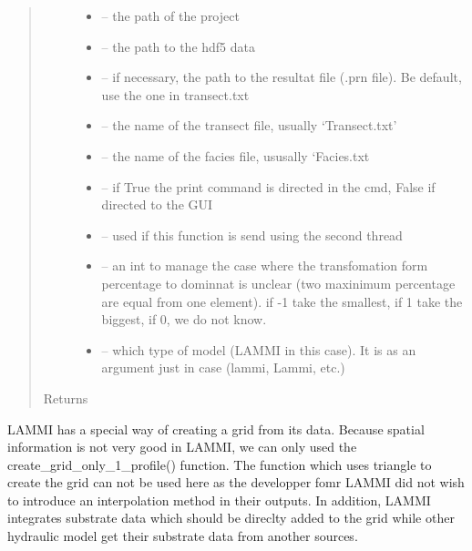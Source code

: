 \documentclass[letterpaper,10pt,english]{sphinxmanual}
\begin{document}
\begin{fulllineitems}
\begin{quote}
\begin{description}
\begin{itemize}
\item {} 
 -- the path of the project

\item {} 
 -- the path to the hdf5 data

\item {} 
 -- if necessary, the path to the resultat file (.prn file). Be default, use the one in transect.txt

\item {} 
 -- the name of the transect file, usually `Transect.txt'

\item {} 
 -- the name of the facies file, ususally `Facies.txt

\item {} 
 -- if True the print command is directed in the cmd, False if directed to the GUI

\item {} 
 -- used if this function is send using the second thread

\item {} 
 -- an int to manage the case where the transfomation form percentage to dominnat is unclear (two
maxinimum percentage are equal from one element). if -1 take the smallest, if 1 take the biggest,
if 0, we do not know.

\item {} 
 -- which type of model (LAMMI in this case). It is as an argument just in case (lammi, Lammi, etc.)

\end{itemize}

\item[{Returns}] \leavevmode


\end{description}\end{quote}


LAMMI has a special way of creating a grid from its data. Because spatial information is not very good in LAMMI,
we can only used the create\_grid\_only\_1\_profile() function. The function which uses triangle to create the grid can
not be used here as the developper fomr LAMMI did not wish to introduce an interpolation method in their outputs.
In addition, LAMMI integrates substrate data which should be direclty added to the grid while other hydraulic model
get their substrate data from another sources.

\end{fulllineitems}
\end{document}
